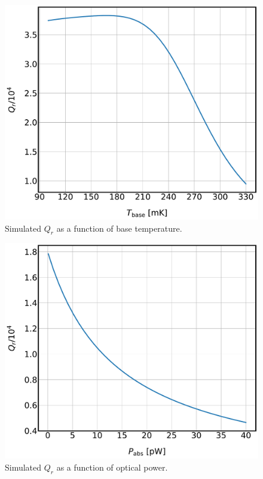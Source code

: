 \begin{figure}[!htbp]
\centering
\includegraphics[width=\textwidth]{figures/kid_model/Qr_v_T}
\caption[Simulated  as a function of base temperature.]{Simulated $Q_{r}$ as a function of base temperature.}
\label{fig:Qr_T}
\end{figure}

\begin{figure}[!htbp]
\centering
\includegraphics[width=\textwidth]{figures/kid_model/Qr_v_P}
\caption[Simulated  as a function of optical power.]{Simulated $Q_{r}$ as a function of optical power.}
\label{fig:Qr_P}
\end{figure}


